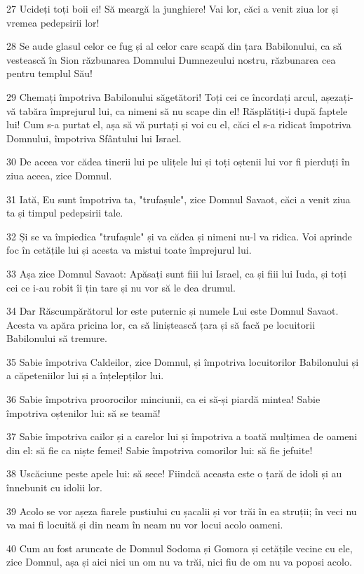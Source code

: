 \par 27 Ucideți toți boii ei! Să meargă la junghiere! Vai lor, căci a venit ziua lor și vremea pedepsirii lor!
\par 28 Se aude glasul celor ce fug și al celor care scapă din țara Babilonului, ca să vestească în Sion răzbunarea Domnului Dumnezeului nostru, răzbunarea cea pentru templul Său!
\par 29 Chemați împotriva Babilonului săgetători! Toți cei ce încordați arcul, așezați-vă tabăra împrejurul lui, ca nimeni să nu scape din el! Răsplătiți-i după faptele lui! Cum s-a purtat el, așa să vă purtați și voi cu el, căci el s-a ridicat împotriva Domnului, împotriva Sfântului lui Israel.
\par 30 De aceea vor cădea tinerii lui pe ulițele lui și toți oștenii lui vor fi pierduți în ziua aceea, zice Domnul.
\par 31 Iată, Eu sunt împotriva ta, "trufașule", zice Domnul Savaot, căci a venit ziua ta și timpul pedepsirii tale.
\par 32 Și se va împiedica "trufașule" și va cădea și nimeni nu-l va ridica. Voi aprinde foc în cetățile lui și acesta va mistui toate împrejurul lui.
\par 33 Așa zice Domnul Savaot: Apăsați sunt fiii lui Israel, ca și fiii lui Iuda, și toți cei ce i-au robit îi țin tare și nu vor să le dea drumul.
\par 34 Dar Răscumpărătorul lor este puternic și numele Lui este Domnul Savaot. Acesta va apăra pricina lor, ca să liniștească țara și să facă pe locuitorii Babilonului să tremure.
\par 35 Sabie împotriva Caldeilor, zice Domnul, și împotriva locuitorilor Babilonului și a căpeteniilor lui și a înțelepților lui.
\par 36 Sabie împotriva proorocilor minciunii, ca ei să-și piardă mintea! Sabie împotriva oștenilor lui: să se teamă!
\par 37 Sabie împotriva cailor și a carelor lui și împotriva a toată mulțimea de oameni din el: să fie ca niște femei! Sabie împotriva comorilor lui: să fie jefuite!
\par 38 Uscăciune peste apele lui: să sece! Fiindcă aceasta este o țară de idoli și au înnebunit cu idolii lor.
\par 39 Acolo se vor așeza fiarele pustiului cu șacalii și vor trăi în ea struții; în veci nu va mai fi locuită și din neam în neam nu vor locui acolo oameni.
\par 40 Cum au fost aruncate de Domnul Sodoma și Gomora și cetățile vecine cu ele, zice Domnul, așa și aici nici un om nu va trăi, nici fiu de om nu va poposi acolo.
